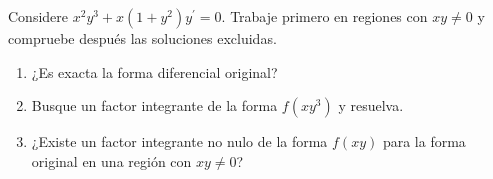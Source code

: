 Considere $x^2y^3+x(1+y^2)y^{\prime}=0$. Trabaje primero en regiones con $xy\ne0$ y compruebe después las soluciones excluidas.

\begin{enumerate}[label=(\alph*),ref=\alph*,leftmargin=*]
\item ¿Es exacta la forma diferencial original?
\item Busque un factor integrante de la forma $f(xy^3)$ y resuelva.
\item ¿Existe un factor integrante no nulo de la forma $f(xy)$ para la forma original en una región con $xy\ne0$?
\end{enumerate}

